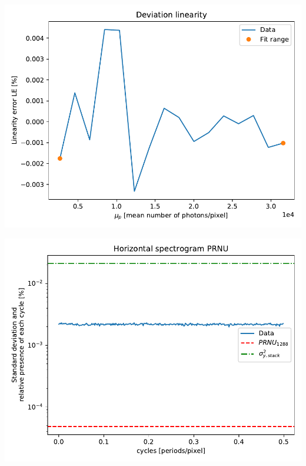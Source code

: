 \documentclass[a4paper,twoside,12pt,american,hidelinks]{article}
\begin{document}
\begin{center}
\includegraphics[height=0.45\textheight,keepaspectratio]{OP1/PlotDeviationLinearity.pdf}
\end{center}
\vfill
\newpage
\begin{center}
\includegraphics[height=0.45\textheight,keepaspectratio]{OP1/PlotHorizontalSpectrogramPRNU.pdf}
\end{center}
\end{document}
